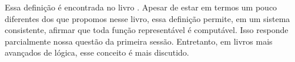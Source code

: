 Essa definição é encontrada no livro \cite{functionsComputaveis}. Apesar de
estar em termos um pouco diferentes dos que propomos nesse livro, essa
definição permite, em um sistema consistente, afirmar que toda função
representável é computável. Isso responde parcialmente nossa questão da
primeira sessão. Entretanto, em livros mais avançados de lógica, esse conceito
é mais discutido. 